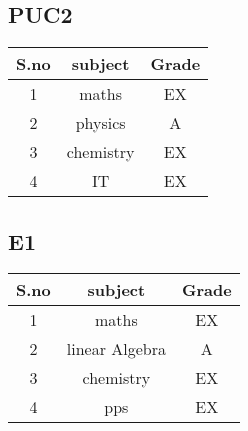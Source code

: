 \subsection{PUC2}
\begin{tabular}{|c|c|c|}
\hline
 S.no&subject&Grade\\
 \hline
 1&maths&EX\\
 \hline
 2&physics&A\\
 \hline
 3&chemistry&EX\\
 \hline
 4&IT&EX\\
 \hline
\end{tabular}
\subsection{E1}
\begin{tabular}{|c|c|c|}
\hline
 S.no&subject&Grade\\
 \hline
 1&maths&EX\\
 \hline
 2&linear Algebra&A\\
 \hline
 3&chemistry&EX\\
 \hline
 4&pps&EX\\
 \hline
\end{tabular}

